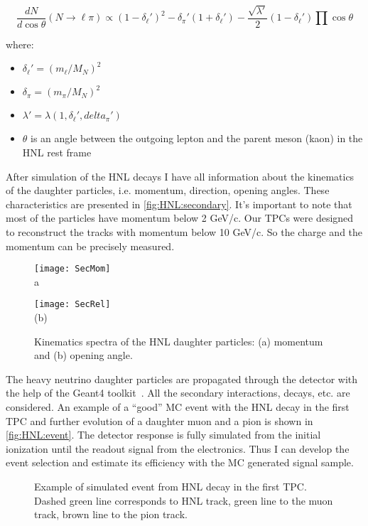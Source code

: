 \documentclass[../main.tex]{subfiles}
\begin{document}
\begin{equation}
    \frac{dN}{d\cos\theta}\left(N\to\ell\pi\right)\propto\left(1-\delta_\ell'\right)^2-\delta_\pi'\left(1+\delta_\ell'\right)-\frac{\sqrt{\lambda'}}{2}\left(1-\delta_\ell'\right)\prod\cos\theta
\end{equation}

where:
\begin{itemize}
    \item $\delta_\ell'=\left(m_\ell/M_N\right)^2$
    \item $\delta_\pi=\left(m_\pi/M_N\right)^2$
    \item $\lambda'=\lambda\left(1, \delta_\ell', delta_\pi'\right)$
    \item $\theta$ is an angle between the outgoing lepton and the parent meson (kaon) in the HNL rest frame
\end{itemize}


After simulation of the HNL decays I have all information about the kinematics of the daughter particles, i.e. momentum, direction, opening angles. These characteristics are presented in \autoref{fig:HNL:secondary}. It's important to note that most of the particles have momentum below 2 GeV/c. Our TPCs were designed to reconstruct the tracks with momentum below 10 GeV/c. So the charge and the momentum can be precisely measured.

\begin{figure}[!ht]
    \begin{minipage}{0.49\linewidth}
        \centering
        \texttt{[image: SecMom]} \\ {a}
    \end{minipage}
    \begin{minipage}{0.49\linewidth}
    \texttt{[image: SecRel]} \\ (b)

    \end{minipage}
        \caption{Kinematics spectra of the HNL daughter particles: (a) momentum and (b) opening angle.}
    \label{fig:HNL:secondary}
\end{figure}

The heavy neutrino daughter particles are propagated through the detector with the help of the Geant4 toolkit~\cite{Agostinelli2003}. All the secondary interactions, decays, etc. are considered. An example of a ``good'' MC event with the HNL decay in the first TPC and further evolution of a daughter muon and a pion is shown in \autoref{fig:HNL:event}. The detector response is fully simulated from the initial ionization until the readout signal from the electronics. Thus I can develop the event selection and estimate its efficiency with the MC generated signal sample.
\begin{figure}[!ht]
    \caption{Example of simulated event from HNL decay in the first TPC. Dashed green line corresponds to HNL track, green line to the muon track, brown line to the pion track.}
    \label{fig:HNL:event}
\end{figure}
\end{document}
